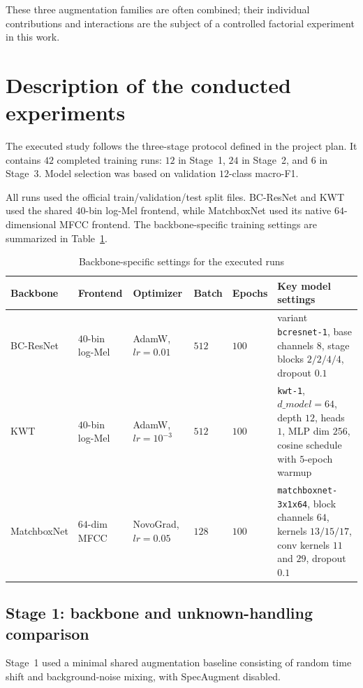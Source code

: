\documentclass[11pt]{article}
\begin{document}
These three augmentation families are often combined; their individual contributions and interactions are the subject of a controlled factorial experiment in this work.



\section{Description of the conducted experiments}
\label{sec:experiments}
The executed study follows the three-stage protocol defined in the project plan. It contains \(42\) completed training runs: \(12\) in Stage~1, \(24\) in Stage~2, and \(6\) in Stage~3. Model selection was based on validation \(12\)-class macro-F1.

All runs used the official train/validation/test split files. BC-ResNet and KWT used the shared \(40\)-bin log-Mel frontend, while MatchboxNet used its native \(64\)-dimensional MFCC frontend. The backbone-specific training settings are summarized in Table~\ref{tab:backbone-settings}.



\begin{table}[t!]
\centering
\caption{Backbone-specific settings for the executed runs}
\label{tab:backbone-settings}
\smallskip
\small
\begin{tabularx}{\textwidth}{@{}l l l l l X@{}}
\toprule
\textbf{Backbone} & \textbf{Frontend} & \textbf{Optimizer} & \textbf{Batch} & \textbf{Epochs} & \textbf{Key model settings}\\
\midrule
BC-ResNet & \(40\)-bin log-Mel & AdamW, \(lr=0.01\) & \(512\) & \(100\) & variant \texttt{bcresnet-1}, base channels \(8\), stage blocks \(2/2/4/4\), dropout \(0.1\) \\
KWT & \(40\)-bin log-Mel & AdamW, \(lr=10^{-3}\) & \(512\) & \(100\) & \texttt{kwt-1}, \(d\_model=64\), depth \(12\), heads \(1\), MLP dim \(256\), cosine schedule with \(5\)-epoch warmup \\
MatchboxNet & \(64\)-dim MFCC & NovoGrad, \(lr=0.05\) & \(128\) & \(100\) & \texttt{matchboxnet-3x1x64}, block channels \(64\), kernels \(13/15/17\), conv kernels \(11\) and \(29\), dropout \(0.1\) \\
\bottomrule
\end{tabularx}
\end{table}


\subsection*{Stage 1: backbone and unknown-handling comparison}
Stage~1 used a minimal shared augmentation baseline consisting of random time shift and background-noise mixing, with SpecAugment disabled.
\end{document}
